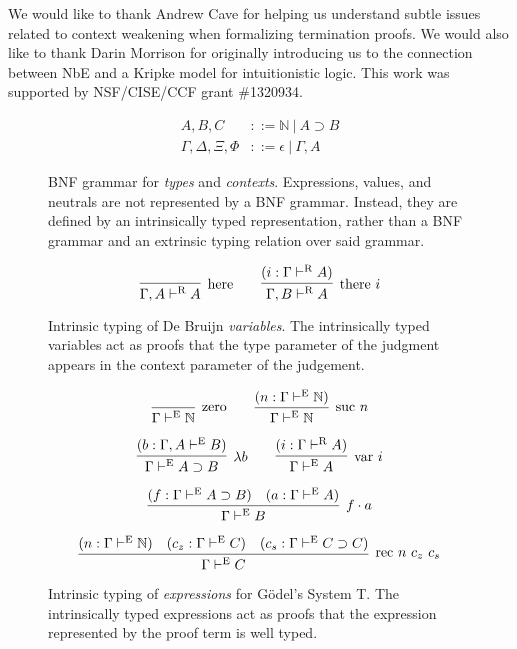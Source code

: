 \documentclass[preprint,nonatbib]{sigplanconf}
\numberwithin{subdefin}{defin}
\theoremstyle{definition}
\numberwithin{subtheorem}{theorem}
\numberwithin{sublemma}{theorem}
\numberwithin{corollary}{theorem}
\numberwithin{case}{theorem}
\numberwithin{slcase}{sublemma}
\numberwithin{scase}{subtheorem}
\numberwithin{lcase}{lemma}
\def\arr{\supset}
\def\app{\cdot}
\def\lam{\lambda}
\def\nat{\mathbb{N}}
\def\emp{\epsilon}
\newcommand{\turn}[1]{\vdash^\con{#1}}
\newcommand{\con}[1]{\textmd{#1}}
\newcommand{\fun}[1]{\textmd{#1}}
\newcommand{\type}[1]{\Gamma \turn{E} #1}
\newcommand{\ctype}[2]{\Gamma , #1 \turn{E} #2}
\newcommand{\typr}[1]{\Gamma \turn{R} #1}
\newcommand{\ctypr}[2]{\Gamma , #1 \turn{R} #2}
\begin{document}
\acks

We would like to thank Andrew Cave for helping us understand subtle
issues related to context weakening when formalizing termination proofs. We would also
like to thank Darin Morrison for originally introducing us to the connection
between NbE and a Kripke model for intuitionistic logic.
This work was supported by NSF/CISE/CCF grant \#1320934.






\appendix
\clearpage

\begin{figure}
\caption{
BNF grammar for {\it types} and {\it contexts}. 
Expressions, values, and neutrals
are not represented by a BNF grammar. Instead, they are defined by
an intrinsically typed representation, rather than a BNF grammar and
an extrinsic typing relation over said grammar.
}
\begin{align*}
A, B, C &::= \nat ~ | ~ A \arr B \\
\Gamma, \Delta, \Xi, \Phi &::= \emp ~ | ~ \Gamma , A
\end{align*}
\label{fig:gram}
\end{figure}

\begin{figure}
\caption{
Intrinsic typing of De Bruijn {\it variables}.
The intrinsically typed variables act as proofs that the type
parameter of the judgment appears in the context parameter of the
judgement.
}
$$
\infer
  [\con{here}]
  {\ctypr{A}{A}}
{
}
\qquad
\infer
  [\con{there} ~ i]
  {\ctypr{B}{A}}
{
  (i : \typr{A})
}
$$
\label{fig:typr}
\end{figure}

\begin{figure}
\caption{
Intrinsic typing of {\it expressions} for G{\"o}del's System T. The
intrinsically typed expressions act as proofs that the expression
represented by the proof term is well typed.
}
$$
\infer
  [\con{zero}]
  {\type{\nat}}
{}
\qquad
\infer
  [\con{suc} ~ n]
  {\type{\nat}}
{
  (n : \type{\nat})
}
$$

$$
\infer
  [\lam b]
  {\type{A \arr B}}
{
  (b : \ctype{A}{B})
}
\qquad
\infer
  [\fun{var} ~ i]
  {\type{A}}
{
  (i : \typr{A})
}
$$

$$
\infer
  [f \app a]
  {\type{B}}
{
  (f : \type{A \arr B})
  &
  (a : \type{A})
}
$$

$$
\infer
  [\fun{rec} ~ n ~ c_z ~ c_s]
  {\type{C}}
{
  (n : \type{\nat})
  &
  (c_z : \type{C})
  &
  (c_s : \type{C \arr C})
}
$$
\label{fig:type}
\end{figure}
\end{document}
